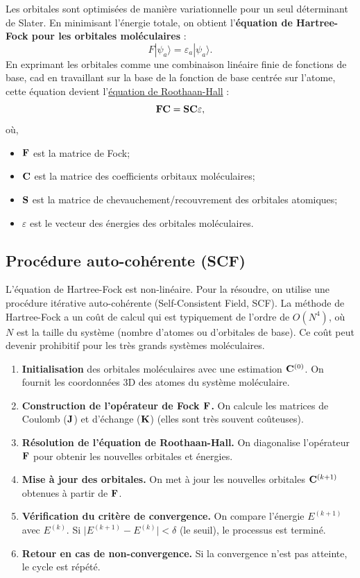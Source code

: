 \documentclass[12pt,a4paper]{article} %
\numberwithin{equation}{section} %
\numberwithin{figure}{section} %
\numberwithin{table}{section} %
\begin{document}
Les orbitales sont optimisées de manière variationnelle pour un seul déterminant de Slater. En minimisant l'énergie totale, on obtient l'\textbf{équation de Hartree-Fock pour les orbitales moléculaires} :
\begin{equation}
F|\psi_a\rangle = \varepsilon_a|\psi_a\rangle .
\end{equation}
En exprimant les orbitales comme une combinaison linéaire finie de fonctions de base, cad en travaillant sur la base de la fonction de base centrée sur l'atome, cette équation devient l'\href{https://en.wikipedia.org/wiki/Roothaan_equations}{équation de Roothaan-Hall} :
\begin{equation}
\vb{F}\vb{C} = \vb{S}\vb{C}\varepsilon , 
\end{equation}
où,
\begin{itemize}
\item $\vb{F}$ est la matrice de Fock;
\item $\vb{C}$ est la matrice des coefficients orbitaux moléculaires;
\item $\vb{S}$ est la matrice de chevauchement/recouvrement des orbitales atomiques;
\item $\varepsilon$ est le vecteur des énergies des orbitales moléculaires.
\end{itemize}

\subsection{Procédure auto-cohérente (SCF)}

L'équation de Hartree-Fock est non-linéaire. Pour la résoudre, on utilise une procédure itérative auto-cohérente (Self-Consistent Field, SCF). La méthode de Hartree-Fock a un coût de calcul qui est typiquement de l'ordre de $O(N^4)$, où $N$ est la taille du système (nombre d'atomes ou d'orbitales de base). Ce coût peut devenir prohibitif pour les très grands systèmes moléculaires.

\begin{enumerate}
\item \textbf{Initialisation} des orbitales moléculaires avec une estimation $\vb{C}^{(0)}$. On fournit les coordonnées 3D des atomes du système moléculaire.
\item \textbf{Construction de l'opérateur de Fock $\vb{F}$.} On calcule les matrices de Coulomb ($\vb{J}$) et d'échange ($\vb{K}$) (elles sont très souvent coûteuses).
\item \textbf{Résolution de l'équation de Roothaan-Hall.} On diagonalise l'opérateur $\vb{F}$ pour obtenir les nouvelles orbitales et énergies.
\item \textbf{Mise à jour des orbitales.} On met à jour les nouvelles orbitales $\vb{C}^{(k+1)}$ obtenues à partir de $\vb{F}$.
\item \textbf{Vérification du critère de convergence.} On compare l'énergie $E^{(k+1)}$ avec $E^{(k)}$. Si $\big|E^{(k+1)} - E^{(k)}\big| < \delta$ (le seuil), le processus est terminé.
\item \textbf{Retour en cas de non-convergence.} Si la convergence n'est pas atteinte, le cycle est répété.
\end{enumerate}
\end{document}
